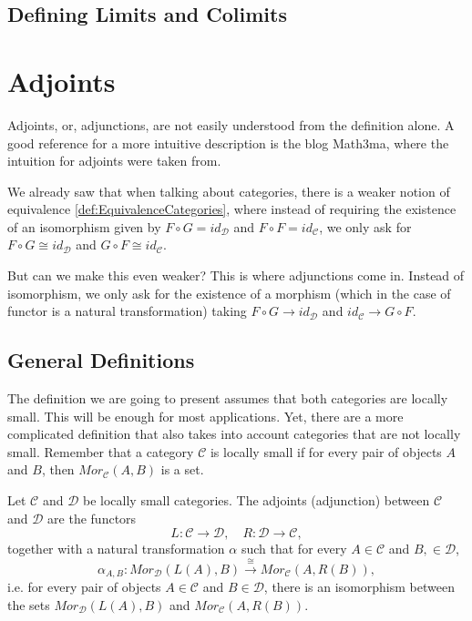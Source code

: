 \subsection{Defining Limits and Colimits}


\section{Adjoints}

Adjoints, or, adjunctions, are not easily understood from the definition alone. 
A good reference for a more intuitive description is the blog Math3ma, where the
intuition for adjoints were taken from.


We already saw that when talking about categories, there is a weaker notion
of equivalence \ref{def:EquivalenceCategories}, where instead of
requiring the existence of an isomorphism given by
$F \circ G = id_\mathcal D$ and $F \circ F = id_\mathcal C$, we only
ask for $F \circ G \cong id_\mathcal D$ and $G \circ F \cong id_\mathcal C$.

But can we make this even weaker? This is where adjunctions come in. Instead
of isomorphism, we only ask for the existence of a morphism (which in the
case of functor is a natural transformation) taking
$F\circ G \to id_\mathcal D$ and
$id_\mathcal C \to G\circ F $.



\subsection{General Definitions}

The definition we are going to present assumes that both categories are locally small. This will
be enough for most applications. Yet, there are a more complicated definition that also takes into
account categories that are not locally small. Remember that a category $\mathcal C$
is locally small if for every pair of objects $A$ and $B$, then $Mor_\mathcal C (A,B)$ is a set.
\begin{definition}
  Let $\mathcal C$ and $\mathcal D$ be locally small categories. The adjoints (adjunction) between
  $\mathcal C$ and $\mathcal D$ are the functors
  \begin{displaymath}
    L:\mathcal C \to \mathcal D, \quad R:\mathcal D \to \mathcal C,
  \end{displaymath}
  together with a natural transformation $\alpha$ such that for every
  $A \in \mathcal C$ and $B, \in \mathcal D$,
  \begin{displaymath}
    \alpha_{A,B}: Mor_\mathcal D (L(A), B) \overset{\cong}{\longrightarrow} Mor_\mathcal C (A, R(B)),
  \end{displaymath}
  i.e. for every pair of objects $A \in \mathcal C$  and $B \in \mathcal D$, there is an isomorphism
  between the sets $Mor_\mathcal D(L(A), B)$ and $Mor_\mathcal C (A, R(B))$.
\end{definition}

